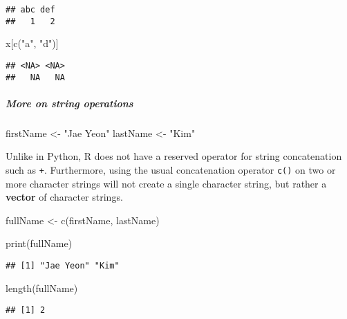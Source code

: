 \documentclass[
]{book}
\newenvironment{Shaded}{\begin{snugshade}}{\end{snugshade}}
\newcommand{\FunctionTok}[1]{\textcolor[rgb]{0.00,0.00,0.00}{#1}}
\newcommand{\NormalTok}[1]{#1}
\newcommand{\OtherTok}[1]{\textcolor[rgb]{0.56,0.35,0.01}{#1}}
\newcommand{\StringTok}[1]{\textcolor[rgb]{0.31,0.60,0.02}{#1}}
\begin{document}
\begin{verbatim}
## abc def 
##   1   2
\end{verbatim}

\begin{Shaded}
\begin{Highlighting}[]
\NormalTok{x[}\FunctionTok{c}\NormalTok{(}\StringTok{"a"}\NormalTok{, }\StringTok{"d"}\NormalTok{)]}
\end{Highlighting}
\end{Shaded}

\begin{verbatim}
## <NA> <NA> 
##   NA   NA
\end{verbatim}

\hypertarget{more-on-string-operations}{%
\subparagraph{More on string operations}\label{more-on-string-operations}}

\begin{Shaded}
\begin{Highlighting}[]
\NormalTok{firstName }\OtherTok{\textless{}{-}} \StringTok{"Jae Yeon"}
\NormalTok{lastName }\OtherTok{\textless{}{-}} \StringTok{"Kim"}
\end{Highlighting}
\end{Shaded}

Unlike in Python, R does not have a reserved operator for string concatenation such as \texttt{+}. Furthermore, using the usual concatenation operator \texttt{c()} on two or more character strings will not create a single character string, but rather a \textbf{vector} of character strings.

\begin{Shaded}
\begin{Highlighting}[]
\NormalTok{fullName }\OtherTok{\textless{}{-}} \FunctionTok{c}\NormalTok{(firstName, lastName)}

\FunctionTok{print}\NormalTok{(fullName)}
\end{Highlighting}
\end{Shaded}

\begin{verbatim}
## [1] "Jae Yeon" "Kim"
\end{verbatim}

\begin{Shaded}
\begin{Highlighting}[]
\FunctionTok{length}\NormalTok{(fullName)}
\end{Highlighting}
\end{Shaded}

\begin{verbatim}
## [1] 2
\end{verbatim}
\end{document}
